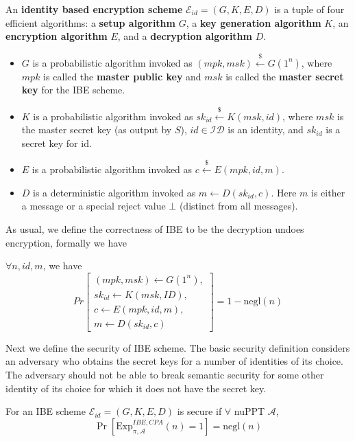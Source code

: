 \begin{definition}
    An \textbf{identity based encryption scheme} $\mathcal{E}_{id} = (G,K,E,D)$ is a tuple of four efficient algorithms: a \textbf{setup algorithm} $G$, a \textbf{key generation algorithm} $K$, an \textbf{encryption algorithm} $E$, and a \textbf{decryption algorithm} $D$.
    \begin{itemize}
        \item $G$ is a probabilistic algorithm invoked as $(mpk, msk)\stackrel{\$}{\gets} G(1^n)$, where $mpk$ is called the \textbf{master public key} and $msk$ is called the \textbf{master secret key} for the IBE scheme.
        \item $K$ is a probabilistic algorithm invoked as $sk_{id}\stackrel{\$}{\gets}K(msk,id )$, where $msk$ is the master secret key (as output by $S$), $id \in \mathcal{ID}$ is an identity, and $sk_{id}$ is a secret key for id.
        \item $E$ is a probabilistic algorithm invoked as $c\stackrel{\$}{\gets}E(mpk,id, m)$.
        \item $D$ is a deterministic algorithm invoked as $m\gets D(sk_{id}, c)$. Here $m$ is either a message or a special reject value $\bot$ (distinct from all messages).
    \end{itemize}
\end{definition}

As usual, we define the correctness of IBE to be the decryption undoes encryption, formally we have 
\begin{definition}
$\forall n, id, m$, we have
\[
Pr\begin{bmatrix}
   (mpk,msk) \gets G(1^n), \\[0.3em]
   sk_{id} \gets K(msk, ID), \\[0.3em]
   c \gets E(mpk, id, m), \\[0.3em]
   m \gets D(sk_{id}, c)
\end{bmatrix}
  =1 - \text{negl}(n)
\]
\end{definition}

Next we define the security of IBE scheme. 
The basic security definition considers an adversary who obtains the secret keys for a number of identities of its choice. 
The adversary should not be able to break semantic security for some other identity of its choice for which it does not have the secret key.

\begin{definition}
    For an IBE scheme $\mathcal{E}_{id}=(G,K,E,D)$ is secure if $\forall$ nuPPT $\mathcal{A}$,
    \[
    \Pr[\text{Exp}_{\pi,\mathcal{A}}^{IBE,CPA}(n)=1]=\text{negl}(n)
    \]
\end{definition}

